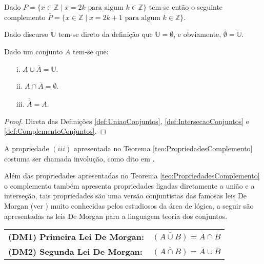 \begin{exemplo}\label{exe:ComplementoConjuntos1}
	Dado $P = \{ x \in \mathbb{Z} \mid x = 2k \mbox{ para algum } k \in \mathbb{Z}\}$ tem-se então o seguinte complemento $\overline{P} = \{ x \in \mathbb{Z} \mid x = 2k + 1 \mbox{ para algum } k \in \mathbb{Z}\}$.
\end{exemplo}

\begin{exemplo}\label{exe:ComplementoConjuntos2}
  Dado discurso $\mathbb{U}$ tem-se direto da definição que $\overline{\mathbb{U}} = \emptyset$, e obviamente, $\overline{\emptyset} = \mathbb{U}$.
\end{exemplo}

\begin{teorema}\label{teo:PropriedadesComplemento}
	Dado um conjunto $A$ tem-se que:
	\begin{itemize}
		\item[i.] $A \cup \overline{A} = \mathbb{U}$.
		\item[ii.] $A \cap \overline{A} = \emptyset$.
		\item[iii.] $\overline{\overline{A}} = A$.
	\end{itemize}
\end{teorema}

\begin{proof}
	Direta das Definições \ref{def:UniaoConjuntos}, \ref{def:IntersecaoConjuntos} e \ref{def:ComplementoConjuntos}.
\end{proof}

\begin{nota}\label{note:Involucao}
  A propriedade $(iii)$ apresentada no Teorema \ref{teo:PropriedadesComplemento} costuma ser chamada involução, como dito em \cite{lipschutz1978-TC}.
\end{nota}

Além das propriedades apresentadas no Teorema \ref{teo:PropriedadesComplemento} o complemento também apresenta propriedades ligadas diretamente a união e a interseção, tais propriedades são uma versão conjuntistas das famosas leis De Morgan (ver \cite{carmo2013, joaoPavao2014, lipschutz2013-MD}) muito conhecidas pelos estudiosos da área de lógica, a seguir são apresentadas as leis De Morgan para a linguagem teoria dos conjuntos.

\begin{table*}[h]
	\centering
	\begin{tabular}{lc}
		\textbf{(DM1) Primeira Lei De Morgan:} & $\overline{(A \cup B)} = \overline{A} \cap \overline{B}$\\
		\textbf{(DM2) Segunda Lei De Morgan:} & $\overline{(A \cap B)} = \overline{A} \cup \overline{B}$\\
	\end{tabular}
\end{table*}

